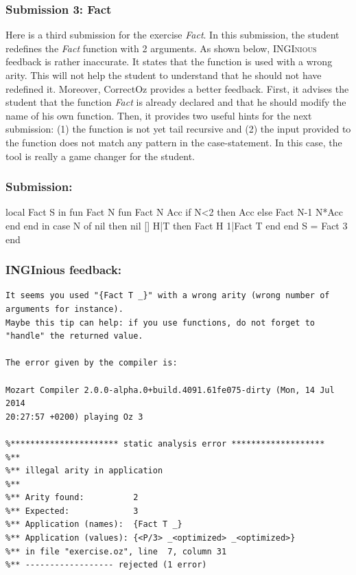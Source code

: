 \documentclass[11pt,a4paper,twoside,openright]{report}
\begin{document}
\subsubsection{Submission 3: Fact}
Here is a third submission for the exercise 
\textit{Fact}. In this submission, the student redefines the \textit{Fact} 
function with 2 arguments. As shown below, 
\textsc{INGInious} feedback is rather inaccurate. It states that the function 
is used with a wrong arity. This will not help the student to understand that he 
should not have redefined it. Moreover, CorrectOz provides a better feedback. 
First, it advises the student that the function \textit{Fact} is already 
declared and that he should modify the name of his own function. Then, it 
provides two useful hints for the next submission: (1) the function is not yet 
tail recursive and (2) the input provided to the function does not match any 
pattern in the case-statement. In this case, the tool is really a game changer 
for the student.

\subsubsection*{Submission:}
 \begin{OZ}
    local Fact S in 
      fun {Fact N}
        fun {Fact N Acc}
          if N<2 then Acc
          else {Fact N-1 N*Acc} end
        end
      in
        case N of nil then nil
        [] H|T then {Fact H 1}|{Fact T}
        end
      end
      S = {Fact 3}
    end
 \end{OZ}
 \newpage
\subsubsection*{INGInious feedback:}
 \begin{lstlisting}
It seems you used "{Fact T _}" with a wrong arity (wrong number of arguments for instance).
Maybe this tip can help: if you use functions, do not forget to "handle" the returned value.

The error given by the compiler is:

Mozart Compiler 2.0.0-alpha.0+build.4091.61fe075-dirty (Mon, 14 Jul 2014 
20:27:57 +0200) playing Oz 3

%********************** static analysis error *******************
%**
%** illegal arity in application
%**
%** Arity found:          2
%** Expected:             3
%** Application (names):  {Fact T _}
%** Application (values): {<P/3> _<optimized> _<optimized>}
%** in file "exercise.oz", line  7, column 31
%** ------------------ rejected (1 error)
 \end{lstlisting}
 
\end{document}
